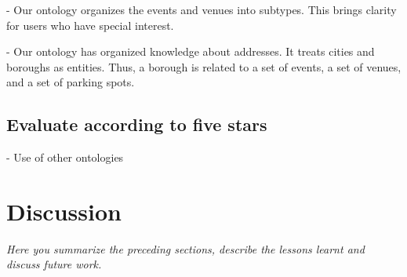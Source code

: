 \documentclass[runningheads,a4paper]{../../StyleFiles/llncs}
\begin{document}
- Our ontology organizes the events and venues into subtypes. This brings clarity for users who have special interest.

- Our ontology has organized knowledge about addresses. It treats cities and boroughs as entities. Thus, a borough is related to a set of events, a set of venues, and a set of parking spots.

\subsection{Evaluate according to five stars}
- Use of other ontologies

\section{Discussion}
\textit{Here you summarize the preceding sections, describe the lessons learnt and discuss future work.}





\end{document}
